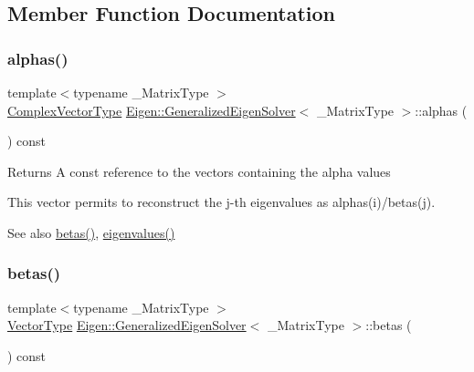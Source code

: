\subsection{Member Function Documentation}
\mbox{\label{class_eigen_1_1_generalized_eigen_solver_a82b1bc41267f46e5c5899d5b084a73bb}} 
\subsubsection{\texorpdfstring{alphas()}{alphas()}}
{\footnotesize\ttfamily template$<$typename \+\_\+\+Matrix\+Type $>$ \\
\mbox{\hyperlink{class_eigen_1_1_generalized_eigen_solver_acfd144329aca76882069da2fc5d53ef5}{Complex\+Vector\+Type}} \mbox{\hyperlink{class_eigen_1_1_generalized_eigen_solver}{Eigen\+::\+Generalized\+Eigen\+Solver}}$<$ \+\_\+\+Matrix\+Type $>$\+::alphas (\begin{DoxyParamCaption}{ }\end{DoxyParamCaption}) const\hspace{0.3cm}{\ttfamily [inline]}}

\begin{DoxyReturn}{Returns}
A const reference to the vectors containing the alpha values
\end{DoxyReturn}
This vector permits to reconstruct the j-\/th eigenvalues as alphas(i)/betas(j).

\begin{DoxySeeAlso}{See also}
\mbox{\hyperlink{class_eigen_1_1_generalized_eigen_solver_abeaa6f56cee367b83fd09d428462ca0c}{betas()}}, \mbox{\hyperlink{class_eigen_1_1_generalized_eigen_solver_a62f01cd78271efd5e39bcb24e0fe1a58}{eigenvalues()}} 
\end{DoxySeeAlso}
\mbox{\label{class_eigen_1_1_generalized_eigen_solver_abeaa6f56cee367b83fd09d428462ca0c}} 
\subsubsection{\texorpdfstring{betas()}{betas()}}
{\footnotesize\ttfamily template$<$typename \+\_\+\+Matrix\+Type $>$ \\
\mbox{\hyperlink{class_eigen_1_1_generalized_eigen_solver_a5aa3d1390c2b0d455c1c9b8b3101b119}{Vector\+Type}} \mbox{\hyperlink{class_eigen_1_1_generalized_eigen_solver}{Eigen\+::\+Generalized\+Eigen\+Solver}}$<$ \+\_\+\+Matrix\+Type $>$\+::betas (\begin{DoxyParamCaption}{ }\end{DoxyParamCaption}) const\hspace{0.3cm}{\ttfamily [inline]}}

